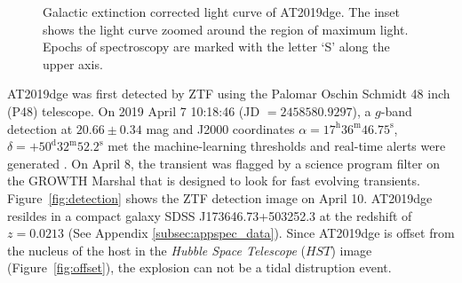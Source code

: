 \documentclass[twocolumn]{aastex63}
\begin{document}
\begin{CJK*}{UTF8}{gbsn}
\begin{figure}[htbp!]
	\caption{Galactic extinction corrected light curve of AT2019dge. The inset shows 
		the light curve zoomed around the region of maximum light. Epochs of spectroscopy are marked 
		with the letter `S' along the upper axis.\label{fig:lightcurve}}
\end{figure}
AT2019dge was first detected by ZTF using the Palomar Oschin Schmidt 48 inch (P48) telescope. On 
2019 April 7 10:18:46 (JD $=2458580.9297$), a $g$-band detection at 
$20.66\pm0.34$ mag and J2000 coordinates $\alpha = 
17^{\mathrm{h}}36^{\mathrm{m}}46.75^{\mathrm{s}}$, $\delta = 
+50^{\mathrm{d}}32^{\mathrm{m}}52.2^{\mathrm{s}}$
met the machine-learning thresholds \citep{Mahabal2019} and real-time alerts were generated 
\citep{Patterson2019}. On April 8, the transient was flagged by a science program filter on the 
GROWTH Marshal \citep{Kasliwal2019} that is designed to look for fast evolving transients. 
Figure~\ref{fig:detection} shows the ZTF detection image on April 10. AT2019dge resildes in a compact 
galaxy SDSS J173646.73+503252.3 at the redshift of $z=0.0213$ (See Appendix 
\ref{subsec:appspec_data}). Since AT2019dge is offset from the nucleus of the host in the 
\textit{Hubble Space Telescope} ($HST$) image (Figure~\ref{fig:offset}), the explosion can not be a 
tidal distruption event.


\end{CJK*}
\end{document}

